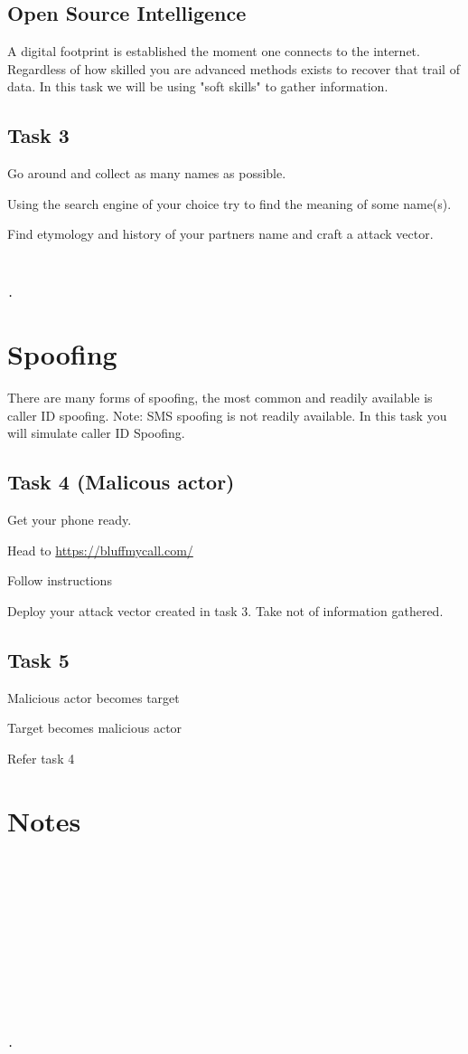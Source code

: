 \documentclass[12pt]{article}
\begin{document}
\subsection*{Open Source Intelligence}
A digital footprint is established the moment one connects to the internet. Regardless of how skilled you are advanced methods exists to recover that trail of data. In this task we will be using "soft skills" to gather information. 
\subsection*{Task 3}
\begin{todolist}
    \item Go around and collect as many names as possible. 
    \item Using the search engine of your choice try to find the meaning of some name(s). 
    \item Find etymology and history of your partners name and craft a attack vector. 
    \begin{lstlisting}


.
\end{lstlisting}
\end{todolist}
\section*{Spoofing}

There are many forms of spoofing, the most common and readily available is caller ID spoofing. Note: SMS spoofing is not readily available. In this task you will simulate caller ID Spoofing. 
\subsection*{Task 4 (Malicous actor)}
\begin{todolist}
    \item Get your phone ready. 
    \item Head to \href{https://bluffmycall.com/}{https://bluffmycall.com/}
    \item Follow instructions
    \item Deploy your attack vector created in task 3. Take not of information gathered. 
\end{todolist}
\subsection*{Task 5}
\begin{todolist}
 \item Malicious actor becomes target
 \item Target becomes malicious actor 
 \item Refer task 4
\end{todolist}
\section*{Notes}
  \begin{lstlisting}












.
\end{lstlisting}
\end{document}
